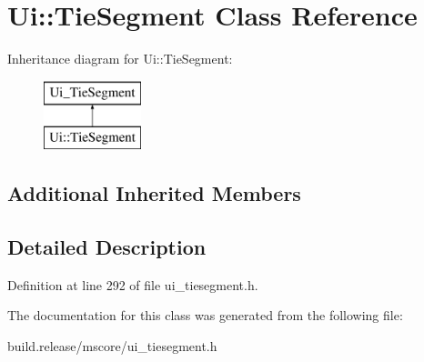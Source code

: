\hypertarget{class_ui_1_1_tie_segment}{}\section{Ui\+:\+:Tie\+Segment Class Reference}
\label{class_ui_1_1_tie_segment}
Inheritance diagram for Ui\+:\+:Tie\+Segment\+:\begin{figure}[H]
\begin{center}
\leavevmode
\includegraphics[height=2.000000cm]{class_ui_1_1_tie_segment}
\end{center}
\end{figure}
\subsection*{Additional Inherited Members}


\subsection{Detailed Description}


Definition at line 292 of file ui\+\_\+tiesegment.\+h.



The documentation for this class was generated from the following file\+:\begin{DoxyCompactItemize}
\item 
build.\+release/mscore/ui\+\_\+tiesegment.\+h\end{DoxyCompactItemize}
